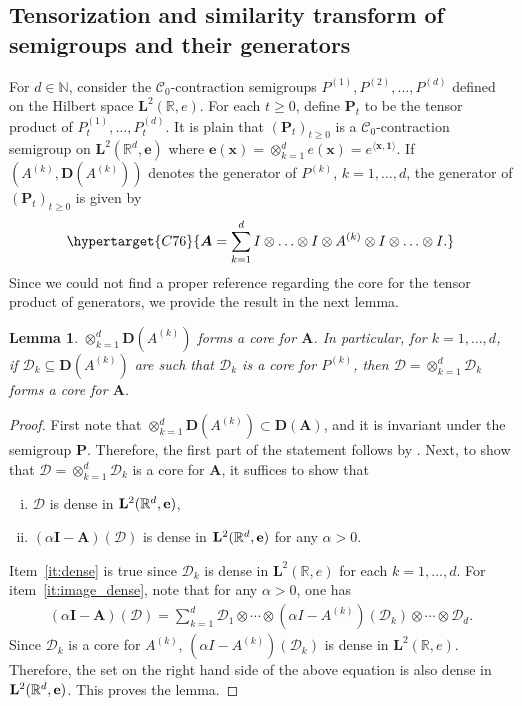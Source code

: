 \documentclass[12pt]{amsart}
\newcommand{\hlabel}{\phantomsection\label}
\newcommand{\hptg}[2]{\hypertarget{#1}{#2}}
\numberwithin{equation}{section}
\newcommand{\bb}{\mathbb}
\newcommand{\cc}{\mathcal}
\renewcommand{\ge}{\geqslant}
\renewcommand{\geq}{\geqslant}
\newcommand{\bmrm}[2][2]{\mathbf{#2}^{#1}}
\newcommand{\D}{\mathbf{D}}
\newcommand{\LRe}{\bmrm{L}(\bb{R},e)}
\newcommand{\LLRe}{\bmrm{L}(\bb R^d,{\bf e})}
\newcommand{\cD}{\mathcal{D}}
\newtheorem{lem}[thm]{Lemma}
\theoremstyle{definition}
\theoremstyle{assump}
\theoremstyle{remark}
\begin{document}
{\subsection{Tensorization and similarity transform of semigroups and their generators}\hlabel{tens_sim} For $d\in\bb{N}$, consider the $\cc{C}_0$-contraction semigroups $P^{(1)}, P^{(2)},\ldots, P^{(d)}$ defined on the Hilbert space $\bmrm{L}(\bb{R},e)$. For each $t\ge 0$, define $\bm{P}_t$ to be the tensor product of $P^{(1)}_t,\ldots, P^{(d)}_t$. It is plain that $(\bm{P}_t)_{t\geq0}$ is a $\cc{C}_0$-contraction semigroup on $\bmrm{L}(\bb{R}^d,\mathbf{e})$ where $\mathbf{e}(\bm x)=\otimes_{k=1}^d e(\bm x)=e^{\langle\bm x,\bm 1\rangle}$. If $(A^{(k)},\D(A^{(k)}))$ denotes the generator of $P^{(k)}$, $k=1,\ldots,d$, the generator of $(\bm{P}_t)_{t\geq0}$ is given by
\begin{align*}
\hptg{C76}{\bm{A}=\sum_{k=1}^d I\otimes\ldots\otimes I\otimes A^{(k)}\otimes I\otimes\ldots\otimes I.}
\end{align*}
Since we could not find a proper reference regarding the core for the tensor product of generators, we provide the result in the next lemma.
\begin{lem}\hlabel{lem:tensor_core}
$\otimes_{k=1}^d\D(A^{(k)})$ forms a core for $\bm{A}$. In particular, for $k=1,\ldots, d$, if $\cc{D}_k\subseteq\D(A^{(k)})$ are such that $\cc{D}_k$ is a core for $P^{(k)}$, then $\bm{\cD}=\otimes_{k=1}^d\cc{D}_k$ forms a core for $\bm{A}$.
\end{lem}
\begin{proof}
	First note that $\otimes_{k=1}^d\D(A^{(k)})\subset\D(\bm A)$, and it is invariant under the semigroup $\bm P$. Therefore, the first part of the statement follows by \cite[Proposition 1.7]{engel-nagel}. Next, to show that $\bm{\cD}=\otimes_{k=1}^d\cc{D}_k$ is a core for $\bm{A}$, it suffices to show that
	\begin{enumerate}[(i)]
		\item \hlabel{it:dense} $\bm{\cc D}$ is dense in $\LLRe$,
		\item \hlabel{it:image_dense} $(\alpha\bm{I}-\bm{A})(\bm{\cc D})$ is dense in $\LLRe$ for any $\alpha>0$.
	\end{enumerate}
Item~\eqref{it:dense} is true since $\cc{D}_k$ is dense in $\LRe$ for each $k=1,\ldots,d$. For item~\eqref{it:image_dense}, note that for any $\alpha>0$, one has
\begin{align*}
	(\alpha\bm{I}-\bm{A})(\bm{\cc D})=\sum_{k=1}^d \cc{D}_1\otimes\cdots\otimes (\alpha I-A^{(k)})(\cc{D}_k)\otimes\cdots\otimes\cc{D}_d.
\end{align*}
Since $\cc{D}_k$ is a core for $A^{(k)}$, $(\alpha I-A^{(k)})(\cc{D}_k)$ is dense in $\LRe$. Therefore, the set on the right hand side of the above equation is also dense in $\LLRe$. This proves the lemma.
\end{proof}

}
\end{document}
